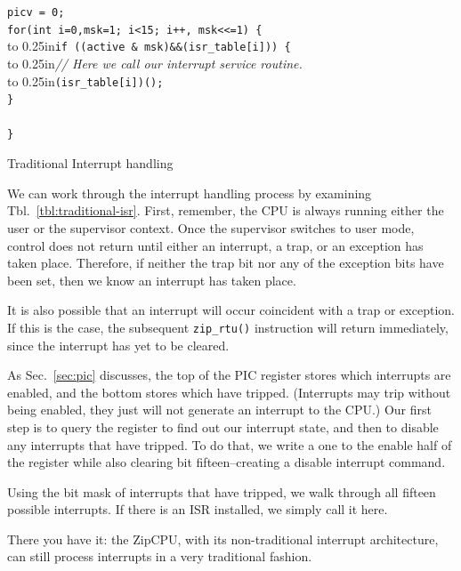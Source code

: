 \documentclass{gqtekspec}
\begin{document}
\begin{table}
\begin{center}
\begin{tabbing}
	\> \>	{\tt picv = 0;}\\
	\> \>	{\tt for(int i=0,msk=1; i<15; i++, msk<<=1) \{}\\
	\> \>\hbox to 0.25in{}\={\tt if ((active \& msk)\&\&(isr\_table[i])) \{}\\
	\> \>\>\hbox to 0.25in{}\={\em // Here we call our interrupt service routine.}\\
	\> \>\>\hbox to 0.25in{}\= {\tt (isr\_table[i])(); }\\
	\> \>	{\tt \} }\\
	\>{\tt \} }\\
{\tt \}}\\
\end{tabbing}
\caption{Traditional Interrupt handling}\label{tbl:traditional-isr}
\end{center}\end{table}

We can work through the interrupt handling process by examining
Tbl.~\ref{tbl:traditional-isr}.  First, remember, the CPU is always running
either the user or the supervisor context.  Once the supervisor switches to
user mode, control does not return until either an interrupt, a trap, or an
exception has taken place.  Therefore, if neither the trap bit nor any of the
exception bits have been set, then we know an interrupt has taken place.

It is also possible that an interrupt will occur coincident with a trap or
exception.  If this is the case, the subsequent {\tt zip\_rtu()} instruction
will return immediately, since the interrupt has yet to be cleared.

As Sec.~\ref{sec:pic} discusses, the top of the PIC register stores which 
interrupts are enabled, and the bottom stores which have tripped.  (Interrupts
may trip without being enabled, they just will not generate an interrupt to the
CPU.)  Our first step is to query the register to find out our interrupt
state, and then to disable any interrupts that have tripped.  To do
that, we write a one to the enable half of the register while also clearing
bit fifteen--creating a disable interrupt command.

Using the bit mask of interrupts that have tripped, we walk through all fifteen
possible interrupts.  If there is an ISR installed, we simply call it here.

There you have it: the ZipCPU, with its non-traditional interrupt architecture,
can still process interrupts in a very traditional fashion. 
\end{document}
